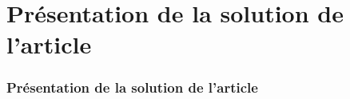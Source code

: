 \section{Présentation de la solution de l'article}
\begin{frame}
\frametitle{Présentation de la solution de l'article}

\end{frame}
